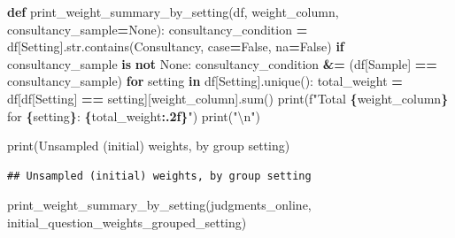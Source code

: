 \documentclass[
]{article}
\newenvironment{Shaded}{\begin{snugshade}}{\end{snugshade}}
\newcommand{\BuiltInTok}[1]{#1}
\newcommand{\CharTok}[1]{\textcolor[rgb]{0.31,0.60,0.02}{#1}}
\newcommand{\ControlFlowTok}[1]{\textcolor[rgb]{0.13,0.29,0.53}{\textbf{#1}}}
\newcommand{\KeywordTok}[1]{\textcolor[rgb]{0.13,0.29,0.53}{\textbf{#1}}}
\newcommand{\NormalTok}[1]{#1}
\newcommand{\OperatorTok}[1]{\textcolor[rgb]{0.81,0.36,0.00}{\textbf{#1}}}
\newcommand{\SpecialCharTok}[1]{\textcolor[rgb]{0.81,0.36,0.00}{\textbf{#1}}}
\newcommand{\SpecialStringTok}[1]{\textcolor[rgb]{0.31,0.60,0.02}{#1}}
\newcommand{\StringTok}[1]{\textcolor[rgb]{0.31,0.60,0.02}{#1}}
\newcommand{\VariableTok}[1]{\textcolor[rgb]{0.00,0.00,0.00}{#1}}
\begin{document}
\begin{Shaded}
\begin{Highlighting}[]
\KeywordTok{def}\NormalTok{ print\_weight\_summary\_by\_setting(df, weight\_column, consultancy\_sample}\OperatorTok{=}\VariableTok{None}\NormalTok{):}
\NormalTok{    consultancy\_condition }\OperatorTok{=}\NormalTok{ df[}\StringTok{\textquotesingle{}Setting\textquotesingle{}}\NormalTok{].}\BuiltInTok{str}\NormalTok{.contains(}\StringTok{\textquotesingle{}Consultancy\textquotesingle{}}\NormalTok{, case}\OperatorTok{=}\VariableTok{False}\NormalTok{, na}\OperatorTok{=}\VariableTok{False}\NormalTok{)}
    \ControlFlowTok{if}\NormalTok{ consultancy\_sample }\KeywordTok{is} \KeywordTok{not} \VariableTok{None}\NormalTok{:}
\NormalTok{        consultancy\_condition }\OperatorTok{\&=}\NormalTok{ (df[}\StringTok{\textquotesingle{}Sample\textquotesingle{}}\NormalTok{] }\OperatorTok{==}\NormalTok{ consultancy\_sample)}
    \ControlFlowTok{for}\NormalTok{ setting }\KeywordTok{in}\NormalTok{ df[}\StringTok{\textquotesingle{}Setting\textquotesingle{}}\NormalTok{].unique():}
\NormalTok{        total\_weight }\OperatorTok{=}\NormalTok{ df[df[}\StringTok{\textquotesingle{}Setting\textquotesingle{}}\NormalTok{] }\OperatorTok{==}\NormalTok{ setting][weight\_column].}\BuiltInTok{sum}\NormalTok{()}
        \BuiltInTok{print}\NormalTok{(}\SpecialStringTok{f"Total }\SpecialCharTok{\{}\NormalTok{weight\_column}\SpecialCharTok{\}}\SpecialStringTok{ for }\SpecialCharTok{\{}\NormalTok{setting}\SpecialCharTok{\}}\SpecialStringTok{: }\SpecialCharTok{\{}\NormalTok{total\_weight}\SpecialCharTok{:.2f\}}\SpecialStringTok{"}\NormalTok{)}
    \BuiltInTok{print}\NormalTok{(}\StringTok{"}\CharTok{\textbackslash{}n}\StringTok{"}\NormalTok{)}

\BuiltInTok{print}\NormalTok{(}\StringTok{\textquotesingle{}Unsampled (initial) weights, by group setting\textquotesingle{}}\NormalTok{)}
\end{Highlighting}
\end{Shaded}

\begin{verbatim}
## Unsampled (initial) weights, by group setting
\end{verbatim}

\begin{Shaded}
\begin{Highlighting}[]
\NormalTok{print\_weight\_summary\_by\_setting(judgments\_online, }\StringTok{\textquotesingle{}initial\_question\_weights\_grouped\_setting\textquotesingle{}}\NormalTok{)}
\end{Highlighting}
\end{Shaded}
\end{document}
